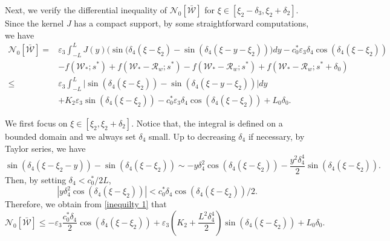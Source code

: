 \documentclass[11pt,a4paper]{article}
\numberwithin{equation}{section}
\numberwithin{figure}{section}
\newcommand\beaa{\begin{eqnarray*}}
\newcommand\eeaa{\end{eqnarray*}}
\begin{document}
Next, we verify the differential inequality of $\mathcal{N}_0[\bar{\mathcal W}]$ for $\xi\in[\xi_2-\delta_3,\xi_2+\delta_2]$.
Since the kernel $J$ has a compact support,
by some straightforward computations, we have
\begin{equation*}
\begin{aligned}
\mathcal{N}_0[\bar{\mathcal W}]=&\varepsilon_3\int_{-L}^LJ(y)\Big(\sin(\delta_4(\xi-\xi_2)-\sin(\delta_4(\xi-y-\xi_2))\Big)dy-c_0^*\varepsilon_3\delta_4\cos(\delta_4(\xi-\xi_2))\\
&-f(\mathcal{W}_*;s^*)+f(\mathcal{W}_*-\mathcal{R}_w;s^*)-f(\mathcal{W}_*-\mathcal{R}_w;s^*)+f(\mathcal{W}_*-\mathcal{R}_w;s^*+\delta_0)\\
\le &\varepsilon_3\int_{-L}^L\Big|\sin(\delta_4(\xi-\xi_2))-\sin(\delta_4(\xi-y-\xi_2))\Big|dy\\
&+K_2\varepsilon_3\sin(\delta_4(\xi-\xi_2))-c_0^*\varepsilon_3\delta_4\cos(\delta_4(\xi-\xi_2))+L_0\delta_0.
\end{aligned}
\end{equation*}

We first focus on $\xi\in[\xi_2,\xi_2+\delta_2]$. Notice that, the integral is defined on a bounded domain and we always set $\delta_4$ small. Up to decreasing $\delta_4$ if necessary, by Taylor series, we have
$$\sin(\delta_4(\xi-\xi_2-y))-\sin(\delta_4(\xi-\xi_2))\sim-y\delta_4^2\cos(\delta_4(\xi-\xi_2))-\frac{y^2\delta_4^4}{2}\sin(\delta_4(\xi-\xi_2)).$$
Then, by setting $\delta_4<c_0^*/2L$,
\begin{equation}\label{inequilty 1}
|y\delta_4^2\cos(\delta_4(\xi-\xi_2))|<c_0^*\delta_4\cos(\delta_4(\xi-\xi_2))/2.
\end{equation}
Therefore, we obtain from \eqref{inequilty 1} that
\begin{equation}\label{inequality 2}
\mathcal{N}_0[\bar{\mathcal W}]\le -\varepsilon_3\frac{c_0^*\delta_4}{2}\cos(\delta_4(\xi-\xi_2))+\varepsilon_3(K_2+\frac{L^2\delta_4^4}{2})\sin(\delta_4(\xi-\xi_2))+L_0\delta_0.
\end{equation}
\end{document}
